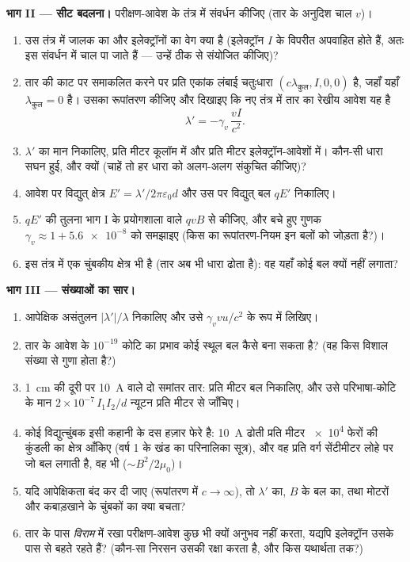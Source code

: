 \begin{problem}[{सप्ताहांत समस्या --- $10^{-24}$ का असंतुलन हर मोटर
कैसे चलाता है}]
\medskip\noindent\textbf{भाग II --- सीट बदलना।}
परीक्षण-आवेश के तंत्र में संवर्धन कीजिए (तार के अनुदिश चाल $v$)।
\begin{enumerate}[resume]
  \item उस तंत्र में जालक का और इलेक्ट्रॉनों का वेग क्या है
        (इलेक्ट्रॉन $I$ के विपरीत अपवाहित होते हैं, अतः इस संवर्धन में
        चाल पा जाते हैं --- उन्हें ठीक से संयोजित कीजिए)?
  \item तार की काट पर समाकलित करने पर प्रति एकांक लंबाई चतुःधारा
        $(c\lambda_{\text{कुल}}, I, 0, 0)$ है, जहाँ यहाँ
        $\lambda_{\text{कुल}} = 0$ है। उसका रूपांतरण कीजिए और दिखाइए
        कि नए तंत्र में तार का रेखीय आवेश यह है
        \[
        \lambda' = -\gamma_v\,\frac{vI}{c^2} .
        \]
  \item $\lambda'$ का मान निकालिए, प्रति मीटर कूलॉम में और प्रति मीटर
        इलेक्ट्रॉन-आवेशों में। कौन-सी धारा सघन हुई, और क्यों
        (चाहें तो हर धारा को अलग-अलग संकुचित कीजिए)?
  \item आवेश पर विद्युत् क्षेत्र $E' = \lambda'/2\pi\varepsilon_0d$
        और उस पर विद्युत् बल $qE'$ निकालिए।
  \item $qE'$ की तुलना भाग I के प्रयोगशाला वाले $qvB$ से कीजिए, और
        बचे हुए गुणक $\gamma_v \approx 1 + \num{5.6e-8}$ को समझाइए
        (किस  का रूपांतरण-नियम इन बलों को जोड़ता है?)।
  \item इस तंत्र में एक चुंबकीय क्षेत्र भी है (तार अब भी धारा ढोता
        है): वह यहाँ कोई बल क्यों नहीं लगाता?
\end{enumerate}

\medskip\noindent\textbf{भाग III --- संख्याओं का सार।}
\begin{enumerate}[resume]
  \item आपेक्षिक असंतुलन $|\lambda'|/\lambda$ निकालिए और उसे
        $\gamma_v vu/c^2$ के रूप में लिखिए।
  \item तार के आवेश के $10^{-19}$ कोटि का प्रभाव कोई स्थूल बल कैसे
        बना सकता है? (वह किस विशाल संख्या से गुणा होता है?)
  \item \qty{1}{cm} की दूरी पर \qty{10}{A} वाले दो समांतर तार:
        प्रति मीटर बल निकालिए, और उसे परिभाषा-कोटि के मान
        $2 \times 10^{-7}\,I_1I_2/d$ न्यूटन प्रति मीटर से जाँचिए।
  \item कोई विद्युत्चुंबक इसी कहानी के दस हज़ार फेरे है:
        \qty{10}{A} ढोती प्रति मीटर \qty{e4}{} फेरों की कुंडली का
        क्षेत्र आँकिए (वर्ष 1 के खंड का परिनालिका सूत्र), और वह
        प्रति वर्ग सेंटीमीटर लोहे पर जो बल लगाती है, वह भी
        ($\sim B^2/2\mu_0$)।
  \item यदि आपेक्षिकता बंद कर दी जाए (रूपांतरण में $c \to \infty$),
        तो $\lambda'$ का, $B$ के बल का, तथा मोटरों और कबाड़खाने के
        चुंबकों का क्या बचता?
  \item तार के पास \emph{विराम} में रखा परीक्षण-आवेश कुछ भी क्यों
        अनुभव नहीं करता, यद्यपि इलेक्ट्रॉन उसके पास से बहते रहते हैं?
        (कौन-सा निरसन उसकी रक्षा करता है, और किस यथार्थता तक?)
\end{enumerate}


\end{problem}
